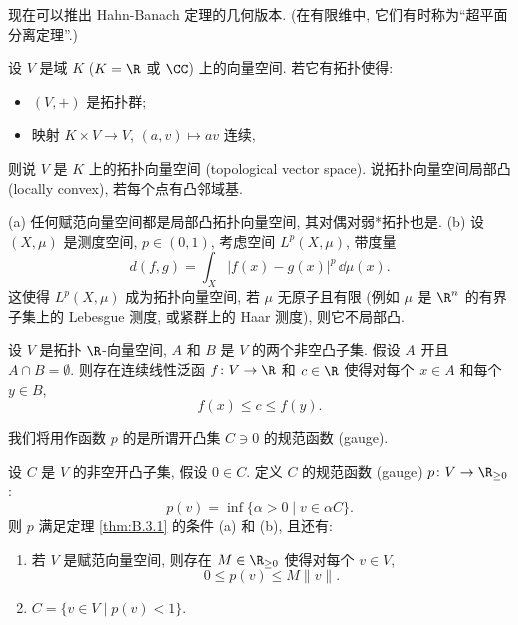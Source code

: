 现在可以推出 Hahn-Banach 定理的几何版本. (在有限维中, 它们有时称为``超平面分离定理''.)

\begin{definition}
\label{def:B.3.5}
设 $V$ 是域 $K$ ($K = \R$ 或 $\CC$) 上的向量空间. 若它有拓扑使得:
\begin{itemize}
\item $(V, +)$ 是拓扑群;
\item 映射 $K \times V \to V$, $(a, v) \longmapsto av$ 连续,
\end{itemize}
则说 $V$ 是 $K$ 上的拓扑向量空间 (topological vector space).
说拓扑向量空间局部凸 (locally convex), 若每个点有凸邻域基.
\end{definition}

\begin{example}[局部凸的例子]
\label{exa:B.3.6}
(a) 任何赋范向量空间都是局部凸拓扑向量空间, 其对偶对弱*拓扑也是.
(b) 设 $(X, \mu)$ 是测度空间, $p \in (0, 1)$, 考虑空间 $L^p(X, \mu)$, 带度量
\[
d(f, g) = \int_X|f(x) - g(x)|^p\,\dd\mu(x).
\]
这使得 $L^p(X, \mu)$ 成为拓扑向量空间, 若 $\mu$ 无原子且有限 (例如 $\mu$ 是 $\R^n$ 的有界子集上的 Lebesgue 测度, 或紧群上的 Haar 测度), 则它不局部凸.
\end{example}

\begin{theorem}
\label{thm:B.3.7}
设 $V$ 是拓扑 $\R$-向量空间, $A$ 和 $B$ 是 $V$ 的两个非空凸子集. 假设 $A$ 开且 $A \cap B = \emptyset$.
则存在连续线性泛函 $f \colon V \to \R$ 和 $c \in \R$ 使得对每个 $x \in A$ 和每个 $y \in B$,
\[
f(x) \leq c \leq f(y).
\]
\end{theorem}

我们将用作函数 $p$ 的是所谓开凸集 $C \ni 0$ 的规范函数 (gauge).

\begin{lemma}[规范函数]
\label{lem:B.3.8}
设 $C$ 是 $V$ 的非空开凸子集, 假设 $0 \in C$. 定义 $C$ 的规范函数 (gauge) $p \colon V \to \R_{\geq 0}$:
\[
p(v) = \inf\{\alpha > 0 \mid v \in \alpha C\}.
\]
则 $p$ 满足定理 \ref{thm:B.3.1} 的条件 (a) 和 (b), 且还有:
\begin{enumerate}
\item[(c)] 若 $V$ 是赋范向量空间, 则存在 $M \in \R_{\geq 0}$ 使得对每个 $v \in V$,
\[
0 \leq p(v) \leq M\|v\|.
\]
\item[(d)] $C = \{v \in V \mid p(v) < 1\}$.
\end{enumerate}
\end{lemma}

